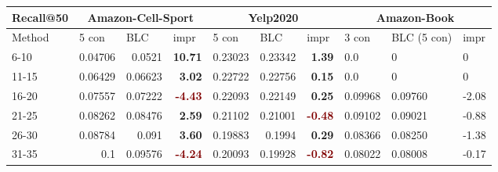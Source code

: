 \begin{table}[]%
    \centering
    \begin{tabular}{|l|r|r|r||r|r|r||l|l|l|}
        \hline
        Recall@50 & \multicolumn{3}{c||}{Amazon-Cell-Sport} & \multicolumn{3}{c|}{Yelp2020} & \multicolumn{3}{c|}{Amazon-Book}                                                                                                                                       \\ \hline
        Method    & \multicolumn{1}{l|}{5 con}              & \multicolumn{1}{l|}{BLC}      & \multicolumn{1}{l||}{impr}             & \multicolumn{1}{l|}{5 con} & \multicolumn{1}{l|}{BLC} & \multicolumn{1}{l||}{impr}            & 3 con   & BLC (5 con) & impr  \\ \hline
        6-10      & 0.04706                                 & 0.0521                        & \textbf{\textcolor{OliveGreen}{10.71}} & 0.23023                    & 0.23342                  & \textbf{\textcolor{OliveGreen}{1.39}} & 0.0     & 0           & 0     \\ \hline
        11-15     & 0.06429                                 & 0.06623                       & \textbf{\textcolor{OliveGreen}{3.02}}  & 0.22722                    & 0.22756                  & \textbf{\textcolor{OliveGreen}{0.15}} & 0.0     & 0           & 0     \\ \hline
        16-20     & 0.07557                                 & 0.07222                       & \textbf{\textcolor{Maroon}{-4.43}}     & 0.22093                    & 0.22149                  & \textbf{\textcolor{OliveGreen}{0.25}} & 0.09968 & 0.09760     & -2.08 \\ \hline
        21-25     & 0.08262                                 & 0.08476                       & \textbf{\textcolor{OliveGreen}{2.59}}  & 0.21102                    & 0.21001                  & \textbf{\textcolor{Maroon}{-0.48}}    & 0.09102 & 0.09021     & -0.88 \\ \hline
        26-30     & 0.08784                                 & 0.091                         & \textbf{\textcolor{OliveGreen}{3.60}}  & 0.19883                    & 0.1994                   & \textbf{\textcolor{OliveGreen}{0.29}} & 0.08366 & 0.08250     & -1.38 \\ \hline
        31-35     & 0.1                                     & 0.09576                       & \textbf{\textcolor{Maroon}{-4.24}}     & 0.20093                    & 0.19928                  & \textbf{\textcolor{Maroon}{-0.82}}    & 0.08022 & 0.08008     & -0.17 \\ \hline

\end{tabular}
\end{table}
